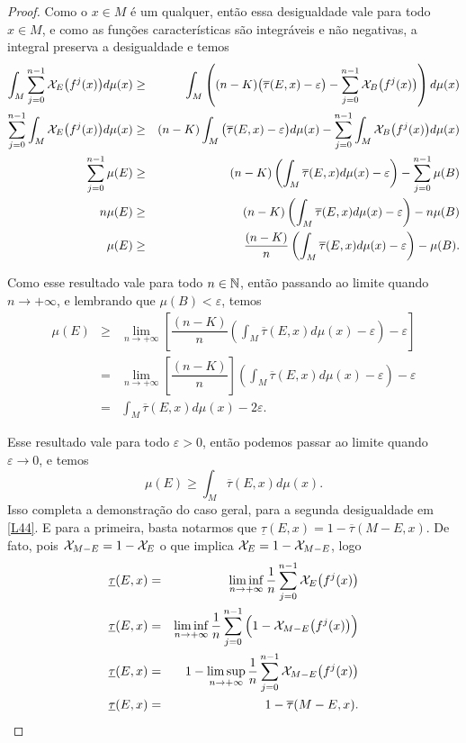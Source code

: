 \begin{proof}
Como o $x\in M$ é um qualquer, então essa desigualdade vale para todo $x\in M$, e como as funções características são integráveis e não negativas, a integral preserva a desigualdade e temos
\begin{eqnarray*}
\int_{M}\sum_{j=0}^{n-1}\mathcal{X}_{E}\big(f^j(x)\big)d\mu(x) & \geq & \int_{M}\left((n-K)\big(\overline{\tau}(E,x)-\varepsilon\big)-\sum_{j=0}^{n-1}\mathcal{X}_{B}\big(f^j(x)\big)\right)d\mu(x)\\
\sum_{j=0}^{n-1}\int_{M}\mathcal{X}_{E}\big(f^j(x)\big)d\mu(x) & \geq & (n-K)\int_{M}\big(\overline{\tau}(E,x)-\varepsilon\big)d\mu(x)-\sum_{j=0}^{n-1}\int_{M}\mathcal{X}_{B}\big(f^j(x)\big)d\mu(x)\\
\sum_{j=0}^{n-1}\mu(E) & \geq & (n-K)\left(\int_{M}\overline{\tau}(E,x)d\mu(x)-\varepsilon\right)-\sum_{j=0}^{n-1}\mu(B)\\
n\mu(E) & \geq & (n-K)\left(\int_{M}\overline{\tau}(E,x)d\mu(x)-\varepsilon\right)-n\mu(B)\\
\mu(E) & \geq & \dfrac{(n-K)}{n}\left(\int_{M}\overline{\tau}(E,x)d\mu(x)-\varepsilon\right)-\mu(B).
\end{eqnarray*}\vspace{0.1cm}

Como esse resultado vale para todo $n\in\mathbb{N}$, então passando ao limite quando $n\to+\infty$, e lembrando que $\mu(B)<\varepsilon$, temos
\begin{eqnarray*}
\mu(E) & \geq & \lim_{n\to+\infty}\left[\dfrac{(n-K)}{n}\left(\int_{M}\overline{\tau}(E,x)d\mu(x)-\varepsilon\right)-\varepsilon\right]\\
& = & \lim_{n\to+\infty}\left[\dfrac{(n-K)}{n}\right]\left(\int_{M}\overline{\tau}(E,x)d\mu(x)-\varepsilon\right)-\varepsilon\\
& = & \int_{M}\overline{\tau}(E,x)d\mu(x)-2\varepsilon.
\end{eqnarray*}

Esse resultado vale para todo $\varepsilon>0$, então podemos passar ao limite quando $\varepsilon\to0$, e temos
\begin{equation}\label{primdesig}
\mu(E)\geq\int_{M}\overline{\tau}(E,x)d\mu(x).
\end{equation}
Isso completa a demonstração do caso geral, para a segunda desigualdade em \eqref{L44}. E para a primeira, basta notarmos que $\underline{\tau}(E,x)=1-\overline{\tau}(M-E,x)$. De fato, pois $\mathcal{X}_{M-E}=1-\mathcal{X}_{E}$ o que implica $\mathcal{X}_{E}=1-\mathcal{X}_{M-E}$, logo
\begin{eqnarray*}
\underline{\tau}(E,x) & = & \liminf_{n\to+\infty}\dfrac{1}{n}\sum_{j=0}^{n-1}\mathcal{X}_{E}\big(f^j(x)\big)\\
\underline{\tau}(E,x) & = & \liminf_{n\to+\infty}\dfrac{1}{n}\sum_{j=0}^{n-1}\Big(1-\mathcal{X}_{M-E}\big(f^j(x)\big)\Big)\\
\underline{\tau}(E,x) & = & 1-\limsup_{n\to+\infty}\dfrac{1}{n}\sum_{j=0}^{n-1}\mathcal{X}_{M-E}\big(f^j(x)\big)\\
\underline{\tau}(E,x) & = & 1-\overline{\tau}(M-E,x).
\end{eqnarray*}


\end{proof}
